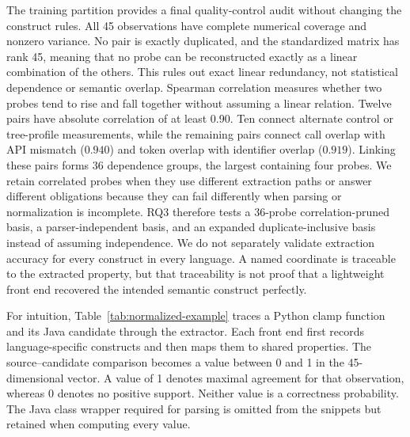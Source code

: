 \documentclass[conference]{IEEEtran}
\begin{document}
The training partition provides a final quality-control audit without changing the construct rules. All 45 observations have complete numerical coverage and nonzero variance. No pair is exactly duplicated, and the standardized matrix has rank 45, meaning that no probe can be reconstructed exactly as a linear combination of the others. This rules out exact linear redundancy, not statistical dependence or semantic overlap. Spearman correlation measures whether two probes tend to rise and fall together without assuming a linear relation. Twelve pairs have absolute correlation of at least 0.90. Ten connect alternate control or tree-profile measurements, while the remaining pairs connect call overlap with API mismatch ($0.940$) and token overlap with identifier overlap ($0.919$). Linking these pairs forms 36 dependence groups, the largest containing four probes. We retain correlated probes when they use different extraction paths or answer different obligations because they can fail differently when parsing or normalization is incomplete. RQ3 therefore tests a 36-probe correlation-pruned basis, a parser-independent basis, and an expanded duplicate-inclusive basis instead of assuming independence. We do not separately validate extraction accuracy for every construct in every language. A named coordinate is traceable to the extracted property, but that traceability is not proof that a lightweight front end recovered the intended semantic construct perfectly.

For intuition, Table~\ref{tab:normalized-example} traces a Python clamp function and its Java candidate through the extractor. Each front end first records language-specific constructs and then maps them to shared properties. The source--candidate comparison becomes a value between 0 and 1 in the 45-dimensional vector. A value of 1 denotes maximal agreement for that observation, whereas 0 denotes no positive support. Neither value is a correctness probability. The Java class wrapper required for parsing is omitted from the snippets but retained when computing every value.
\end{document}
